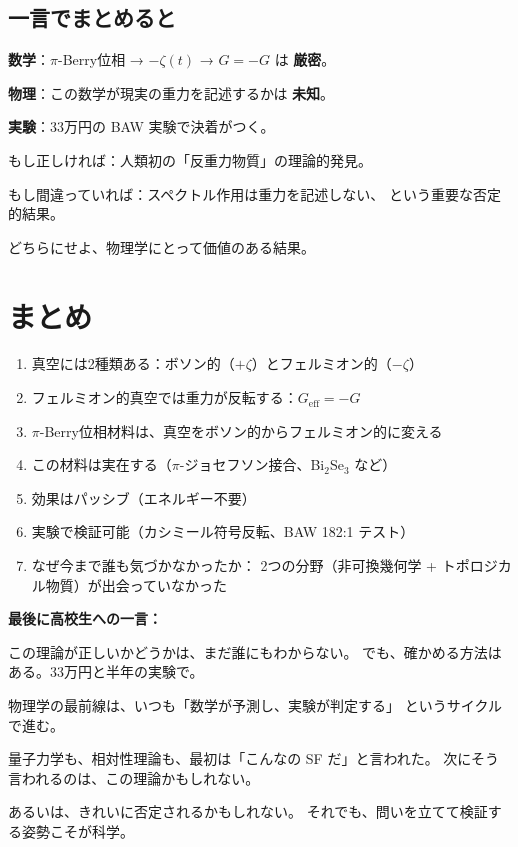 \documentclass[11pt,a4paper]{article}
\begin{document}
\subsection{一言でまとめると}

\begin{tcolorbox}[colback=blue!5,colframe=blue!60!black]
\textbf{数学}：$\pi$-Berry位相 → $-\zeta(t)$ → $G = -G$ は \textbf{厳密}。

\textbf{物理}：この数学が現実の重力を記述するかは \textbf{未知}。

\textbf{実験}：33万円の BAW 実験で決着がつく。

もし正しければ：人類初の「反重力物質」の理論的発見。

もし間違っていれば：スペクトル作用は重力を記述しない、
という重要な否定的結果。

どちらにせよ、物理学にとって価値のある結果。
\end{tcolorbox}


\section{まとめ}

\begin{enumerate}
\item 真空には2種類ある：ボソン的（$+\zeta$）とフェルミオン的（$-\zeta$）
\item フェルミオン的真空では重力が反転する：$G_{\mathrm{eff}} = -G$
\item $\pi$-Berry位相材料は、真空をボソン的からフェルミオン的に変える
\item この材料は実在する（$\pi$-ジョセフソン接合、Bi$_2$Se$_3$ など）
\item 効果はパッシブ（エネルギー不要）
\item 実験で検証可能（カシミール符号反転、BAW 182:1 テスト）
\item なぜ今まで誰も気づかなかったか：
  2つの分野（非可換幾何学 + トポロジカル物質）が出会っていなかった
\end{enumerate}

\vspace{1em}

\begin{tcolorbox}[colback=green!5,colframe=green!60!black]
\textbf{最後に高校生への一言：}

この理論が正しいかどうかは、まだ誰にもわからない。
でも、確かめる方法はある。33万円と半年の実験で。

物理学の最前線は、いつも「数学が予測し、実験が判定する」
というサイクルで進む。

量子力学も、相対性理論も、最初は「こんなの SF だ」と言われた。
次にそう言われるのは、この理論かもしれない。

あるいは、きれいに否定されるかもしれない。
それでも、問いを立てて検証する姿勢こそが科学。
\end{tcolorbox}
\end{document}
